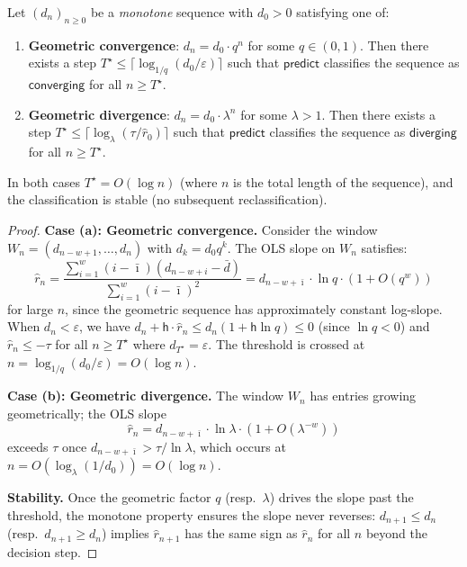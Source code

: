 \documentclass[11pt]{article}
\newcommand{\Horizon}{\mathsf{h}}           %
\newcommand{\DescentSeq}{(d_n)_{n\ge 0}}    %
\newcommand{\DescentN}{d_n}                 %
\newcommand{\DescentRate}{r}                %
\newcommand{\Thresh}{\tau}                  %
\newcommand{\Predict}{\mathsf{predict}}     %
\newcommand{\StepsToDecide}{T^{\star}}      %
\begin{document}
\begin{theorem}\label{thm:accuracy}
Let $\DescentSeq$ be a \emph{monotone} sequence with $d_0 > 0$
satisfying one of:
\begin{enumerate}[label=(\alph*)]
  \item \textbf{Geometric convergence}: $d_n = d_0 \cdot q^n$ for some
        $q \in (0,1)$.  Then there exists a step
        $\StepsToDecide \le \lceil\log_{1/q}(d_0/\varepsilon)\rceil$
        such that $\Predict$ classifies the sequence as $\mathsf{converging}$
        for all $n \ge \StepsToDecide$.
  \item \textbf{Geometric divergence}: $d_n = d_0 \cdot \lambda^n$ for
        some $\lambda > 1$.  Then there exists a step
        $\StepsToDecide \le \lceil\log_{\lambda}(\Thresh/\hat{\DescentRate}_0)\rceil$
        such that $\Predict$ classifies the sequence as $\mathsf{diverging}$
        for all $n \ge \StepsToDecide$.
\end{enumerate}
In both cases $\StepsToDecide = O(\log n)$ (where $n$ is the total
length of the sequence), and the classification is stable (no
subsequent reclassification).
\end{theorem}

\begin{proof}
\textbf{Case (a): Geometric convergence.}
Consider the window $W_n = (d_{n-w+1},\ldots,d_n)$ with
$d_k = d_0 q^k$.  The OLS slope on $W_n$ satisfies:
\[
  \hat{\DescentRate}_n
  = \frac{\sum_{i=1}^{w}(i-\bar\imath)(d_{n-w+i}-\bar d)}
         {\sum_{i=1}^{w}(i-\bar\imath)^2}
  = d_{n-w+\bar\imath} \cdot \ln q \cdot (1 + O(q^w))
\]
for large $n$, since the geometric sequence has approximately
constant log-slope.  When $d_n < \varepsilon$, we have
$\DescentN + \Horizon \cdot \hat{\DescentRate}_n \le d_n(1 + \Horizon\ln q) \le 0$
(since $\ln q < 0$) and $\hat{\DescentRate}_n \le -\Thresh$ for all
$n \ge \StepsToDecide$ where $d_{\StepsToDecide} = \varepsilon$.  The
threshold is crossed at $n = \log_{1/q}(d_0/\varepsilon) = O(\log n)$.

\textbf{Case (b): Geometric divergence.}
The window $W_n$ has entries growing geometrically; the OLS slope
\[
  \hat{\DescentRate}_n = d_{n-w+\bar\imath} \cdot \ln\lambda \cdot (1+O(\lambda^{-w}))
\]
exceeds $\Thresh$ once $d_{n-w+\bar\imath} > \Thresh / \ln\lambda$,
which occurs at $n = O(\log_\lambda(1/d_0)) = O(\log n)$.

\textbf{Stability.}
Once the geometric factor $q$ (resp.\ $\lambda$) drives the slope
past the threshold, the monotone property ensures the slope never
reverses: $d_{n+1} \le d_n$ (resp.\ $d_{n+1} \ge d_n$) implies
$\hat{\DescentRate}_{n+1}$ has the same sign as $\hat{\DescentRate}_n$
for all $n$ beyond the decision step.
\end{proof}
\end{document}

